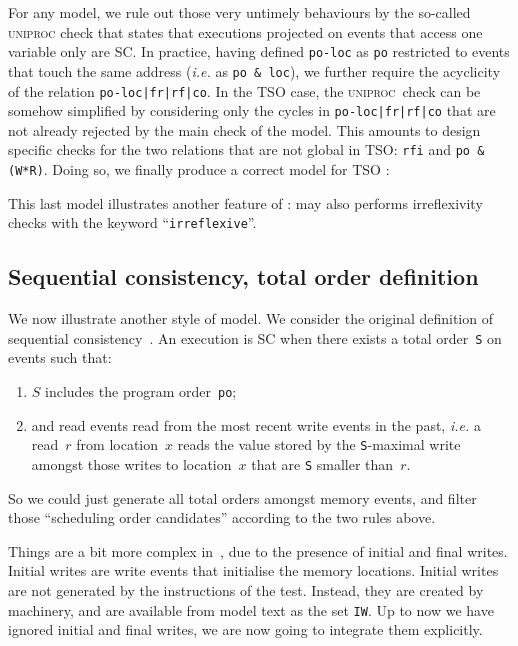 \label{defuniproc}For any model, we rule out those very
untimely behaviours by the so-called
\textsc{uniproc}
check that states that executions projected on events that access one variable
only are SC.
In practice, having defined \verb+po-loc+ as \verb+po+ restricted to
events that touch the same address (\emph{i.e.}
as \verb+po & loc+), we further require the acyclicity
of the relation \verb+po-loc|fr|rf|co+.
In the TSO case, the \textsc{uniproc}~check can be
somehow simplified by considering only
the cycles in \verb+po-loc|fr|rf|co+ that 
are not already rejected by the main check of the model.
This amounts to design specific checks for the two relations that are
not global in TSO: \verb+rfi+ and \verb+po & (W*R)+.
Doing so, we finally produce a correct model for TSO :

This last model illustrates another feature of \cat{}:
\herd{} may also performs irreflexivity checks with the keyword
``\verb+irreflexive+''.

\subsection{Sequential consistency, total order definition}
We now illustrate another style of model.
We consider the original definition of sequential consistency~\cite{lam79}.
An execution is SC when there exists a total order~\verb+S+ on events such that:
\begin{enumerate}
\item $S$ includes the program order~\verb+po+;
\item \label{rfcond}and read events read from the most recent write events in the past,
\emph{i.e.} a read~$r$ from location~$x$ reads the value stored by
the \verb+S+-maximal write amongst those writes to location~$x$
that are \verb+S+ smaller than~$r$.
\end{enumerate}
So we could just generate all total orders amongst memory events,
and filter those ``scheduling order candidates'' according to the two rules
above.

Things are a bit more complex in~\herd{}, due to the presence of initial and final writes.
Initial writes are write events that initialise the memory locations.
Initial writes are not generated by the instructions of the test.
Instead, they are created by \herd{} machinery, and are available
from model text as the set \verb+IW+.
Up to now we have ignored initial and final writes, we are now going to
integrate them explicitly.

